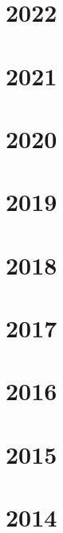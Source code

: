 \documentclass[
]{book}
\begin{document}
\chapter{2022}\label{section-4}

\chapter{2021}\label{section-5}

\chapter{2020}\label{section-6}

\chapter{2019}\label{section-7}

\chapter{2018}\label{section-8}

\chapter{2017}\label{section-9}

\chapter{2016}\label{section-10}

\chapter{2015}\label{section-11}

\chapter{2014}\label{section-12}


\end{document}
